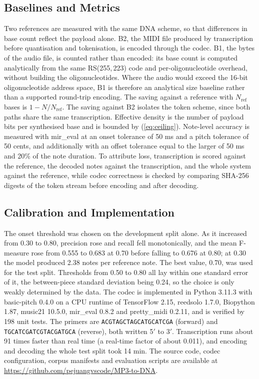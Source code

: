 \documentclass[conference]{IEEEtran}
\begin{document}
\subsection{Baselines and Metrics}
\label{subsec:metrics}

Two references are measured with the same DNA scheme, so that differences in base count reflect the payload alone. B2, the MIDI file produced by transcription before quantisation and tokenisation, is encoded through the codec. B1, the bytes of the audio file, is counted rather than encoded: its base count is computed analytically from the same RS(255,\,223) code and per-oligonucleotide overhead, without building the oligonucleotides. Where the audio would exceed the 16-bit oligonucleotide address space, B1 is therefore an analytical size baseline rather than a supported round-trip encoding. The saving against a reference with $N_{\mathrm{ref}}$ bases is $1 - N/N_{\mathrm{ref}}$. The saving against B2 isolates the token scheme, since both paths share the same transcription. Effective density is the number of payload bits per synthesised base and is bounded by (\ref{eq:ceiling}). Note-level accuracy is measured with mir\_eval \cite{raffel} at an onset tolerance of 50 ms and a pitch tolerance of 50 cents, and additionally with an offset tolerance equal to the larger of 50 ms and 20\% of the note duration. To attribute loss, transcription is scored against the reference, the decoded notes against the transcription, and the whole system against the reference, while codec correctness is checked by comparing SHA-256 digests of the token stream before encoding and after decoding.

\subsection{Calibration and Implementation}
\label{subsec:calibration}

The onset threshold was chosen on the development split alone. As it increased from 0.30 to 0.80, precision rose and recall fell monotonically, and the mean F-measure rose from 0.555 to 0.683 at 0.70 before falling to 0.676 at 0.80; at 0.30 the model produced 2.38 notes per reference note. The best value, 0.70, was used for the test split. Thresholds from 0.50 to 0.80 all lay within one standard error of it, the between-piece standard deviation being 0.24, so the choice is only weakly determined by the data. The codec is implemented in Python 3.11.3 with basic-pitch 0.4.0 on a CPU runtime of TensorFlow 2.15, reedsolo 1.7.0, Biopython 1.87, music21 10.5.0, mir\_eval 0.8.2 and pretty\_midi 0.2.11, and is verified by 198 unit tests. The primers are \texttt{ACGTAGCTAGCATGCATCGA} (forward) and \texttt{TGCATCGATCGTACGATGCA} (reverse), both written 5$'$ to 3$'$. Transcription runs about 91 times faster than real time (a real-time factor of about 0.011), and encoding and decoding the whole test split took 14 min. The source code, codec configuration, corpus manifests and evaluation scripts are available at \url{https://github.com/pejuangvscode/MP3-to-DNA}.
\end{document}
